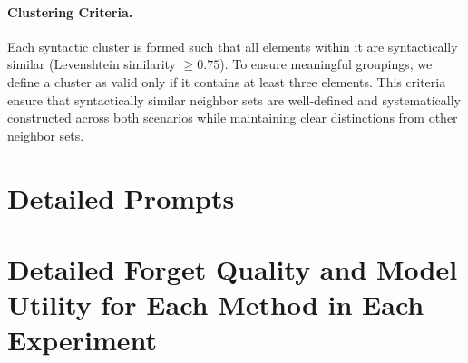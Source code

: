 \paragraph{Clustering Criteria.} 
Each syntactic cluster is formed such that all elements within it are syntactically similar (Levenshtein similarity $\geq 0.75$). To ensure meaningful groupings, we define a cluster as valid only if it contains at least three elements. This criteria ensure that syntactically similar neighbor sets are well-defined and systematically constructed across both scenarios while maintaining clear distinctions from other neighbor sets.



\section{Detailed Prompts}




\section{Detailed Forget Quality and Model Utility for Each Method in Each Experiment}
\label{appendix:detailedResultsPerMethods}






